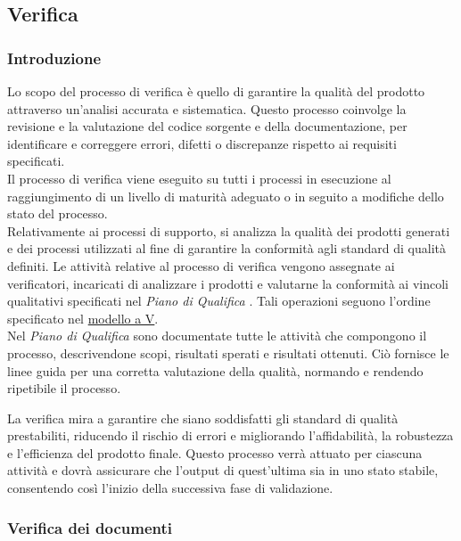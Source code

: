 \subsection{Verifica}
\label{sec:verifica}

\subsubsection{Introduzione}
Lo scopo del processo di verifica è quello di garantire la qualità del prodotto attraverso un'analisi accurata e sistematica. Questo processo coinvolge la revisione e la valutazione del codice sorgente e della documentazione, per identificare e correggere errori, difetti o discrepanze rispetto ai requisiti specificati.  \\
Il processo di verifica viene eseguito su tutti i processi in esecuzione al raggiungimento di un livello di maturità adeguato o in seguito a modifiche dello stato del processo. \\
Relativamente ai processi di supporto, si analizza la qualità dei prodotti generati e dei processi utilizzati al fine di garantire la conformità agli standard di qualità definiti.
Le attività relative al processo di verifica vengono assegnate ai verificatori, incaricati di analizzare i prodotti e valutarne la conformità ai vincoli qualitativi specificati nel \textit{Piano di Qualifica} . Tali operazioni seguono l'ordine specificato nel \href{https://it.wikipedia.org/wiki/V-Model}{modello a V}. \\
Nel \textit{Piano di Qualifica} sono documentate tutte le attività che compongono il processo, descrivendone scopi, risultati sperati e risultati ottenuti. Ciò fornisce le linee guida per una corretta valutazione della qualità, normando e rendendo ripetibile il processo.

La verifica mira a garantire che siano soddisfatti gli standard di qualità prestabiliti, riducendo il rischio di errori e migliorando l'affidabilità, la robustezza e l'efficienza del prodotto finale.
Questo processo verrà attuato per ciascuna attività  e dovrà assicurare che l'output di quest'ultima sia in uno stato stabile, consentendo così l'inizio della successiva fase di validazione.

\subsubsection{Verifica dei documenti}
\label{sec:verificatori}

